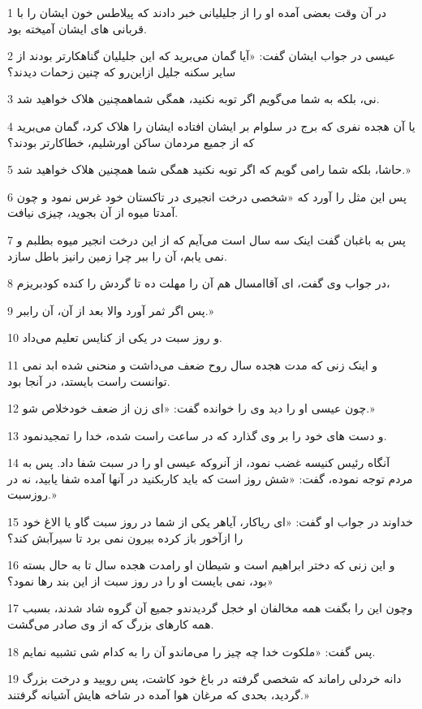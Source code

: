 \par 1 در آن وقت بعضی آمده او را از جلیلیانی خبر دادند که پیلاطس خون ایشان را با قربانی های ایشان آمیخته بود.
\par 2 عیسی در جواب ایشان گفت: «آیا گمان می‌برید که این جلیلیان گناهکارتر بودند از سایر سکنه جلیل ازاین‌رو که چنین زحمات دیدند؟
\par 3 نی، بلکه به شما می‌گویم اگر توبه نکنید، همگی شماهمچنین هلاک خواهید شد.
\par 4 یا آن هجده نفری که برج در سلوام بر ایشان افتاده ایشان را هلاک کرد، گمان می‌برید که از جمیع مردمان ساکن اورشلیم، خطاکارتر بودند؟
\par 5 حاشا، بلکه شما رامی گویم که اگر توبه نکنید همگی شما همچنین هلاک خواهید شد.»
\par 6 پس این مثل را آورد که «شخصی درخت انجیری در تاکستان خود غرس نمود و چون آمدتا میوه از آن بجوید، چیزی نیافت.
\par 7 پس به باغبان گفت اینک سه سال است می‌آیم که از این درخت انجیر میوه بطلبم و نمی یابم، آن را ببر چرا زمین رانیز باطل سازد.
\par 8 در جواب وی گفت، ای آقاامسال هم آن را مهلت ده تا گردش را کنده کودبریزم،
\par 9 پس اگر ثمر آورد والا بعد از آن، آن راببر.»
\par 10 و روز سبت در یکی از کنایس تعلیم می‌داد.
\par 11 و اینک زنی که مدت هجده سال روح ضعف می‌داشت و منحنی شده ابد نمی توانست راست بایستد، در آنجا بود.
\par 12 چون عیسی او را دید وی را خوانده گفت: «ای زن از ضعف خودخلاص شو.»
\par 13 و دست های خود را بر وی گذارد که در ساعت راست شده، خدا را تمجیدنمود.
\par 14 آنگاه رئیس کنیسه غضب نمود، از آنروکه عیسی او را در سبت شفا داد. پس به مردم توجه نموده، گفت: «شش روز است که باید کاربکنید در آنها آمده شفا یابید، نه در روزسبت.»
\par 15 خداوند در جواب او گفت: «ای ریاکار، آیاهر یکی از شما در روز سبت گاو یا الاغ خود را ازآخور باز کرده بیرون نمی برد تا سیرآبش کند؟
\par 16 و این زنی که دختر ابراهیم است و شیطان او رامدت هجده سال تا به حال بسته بود، نمی بایست او را در روز سبت از این بند رها نمود؟»
\par 17 وچون این را بگفت همه مخالفان او خجل گردیدندو جمیع آن گروه شاد شدند، بسبب همه کارهای بزرگ که از وی صادر می‌گشت.
\par 18 پس گفت: «ملکوت خدا چه چیز را می‌ماندو آن را به کدام شی تشبیه نمایم.
\par 19 دانه خردلی راماند که شخصی گرفته در باغ خود کاشت، پس رویید و درخت بزرگ گردید، بحدی که مرغان هوا آمده در شاخه هایش آشیانه گرفتند.»
